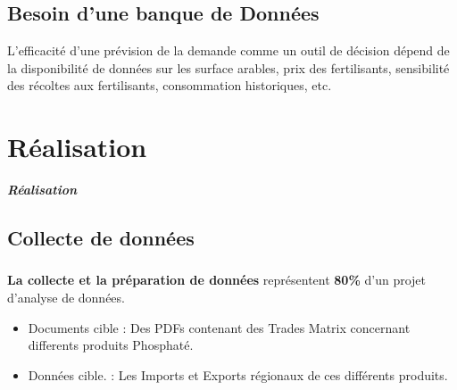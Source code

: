 \documentclass[handout]{beamer}
\begin{document}
\subsection{Besoin d'une banque de Données}
\begin{frame}
\begin{block}{}
\footnotesize{L'efficacité d'une prévision de la demande comme un outil de décision dépend de la disponibilité de données sur les surface arables, prix des fertilisants, sensibilité des récoltes aux fertilisants, consommation historiques, etc.}

\end{block}
\end{frame}
\section{Réalisation}

\begin{frame}
	\begin{center}
		\Huge \textbf{\textit{Réalisation}}
	\end{center}
\end{frame}

\subsection{Collecte de données}
\begin{frame}
  \frametitle{}
  \textbf{La collecte et la préparation de données} représentent \textbf{80\%} d'un projet d'analyse de données.\\
  \begin{itemize}
    \item Documents cible : Des PDFs contenant des Trades Matrix concernant differents produits Phosphaté.
    \item Données cible. : Les Imports et Exports régionaux de ces différents produits.
  \end{itemize}
\end{frame}
\end{document}

